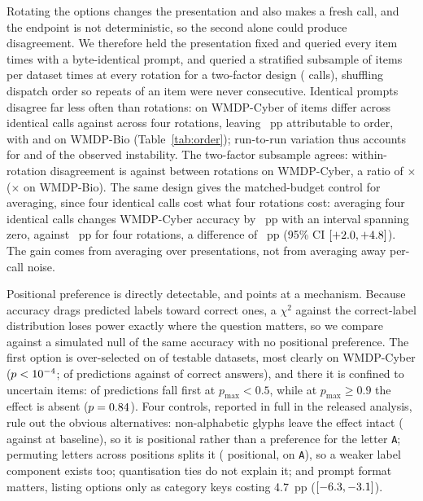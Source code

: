 \documentclass[conference,compsoc]{IEEEtran}
\newcommand{\pmax}{p_{\max}}
\begin{document}
Rotating the options changes the presentation and also makes a fresh call, and the endpoint
is not deterministic, so the second alone could produce disagreement. We therefore held the
presentation fixed and queried every item \statReRepeats{} times with a byte-identical
prompt, and queried a stratified subsample of \statReFacItems{} items per dataset
\statReFacRepeats{} times at every rotation for a two-factor design (\statReCalls{} calls),
shuffling dispatch order so repeats of an item were never consecutive. Identical prompts
disagree far less often than rotations: on WMDP-Cyber \statReIdentCyber{} of items differ
across \statReRepeats{} identical calls against \statReRotCyber{} across four rotations,
leaving \statReGapCyber{}~pp attributable to order, with \statReIdentBio{} and
\statReRotBio{} on WMDP-Bio (Table~\ref{tab:order}); run-to-run variation thus accounts for
\statReNoiseShareCyber{} and \statReNoiseShareBio{} of the observed instability. The
two-factor subsample agrees: within-rotation disagreement is \statReWithinCyber{} against
\statReBetweenCyber{} between rotations on WMDP-Cyber, a ratio of
\statReRatioCyber{}$\times$ (\statReRatioBio{}$\times$ on WMDP-Bio). The same design gives
the matched-budget control for averaging, since four identical calls cost
what four rotations cost: averaging four identical calls changes WMDP-Cyber accuracy by
\statReGainIdentCyber{}~pp with an interval spanning zero, against
\statReGainRotCyber{}~pp for four rotations, a difference of \statReGainDiffCyber{}~pp
(95\% CI $[+2.0, +4.8]{}$). The gain comes from averaging over presentations, not
from averaging away per-call noise.

Positional preference is directly detectable, and points at a mechanism. Because accuracy
drags predicted labels toward correct ones, a $\chi^2$ against the correct-label
distribution loses power exactly where the question matters, so we compare against a
simulated null of the same accuracy with no positional preference. The first option is
over-selected on \statNSigPosDatasets{} of \statNTestedPosDatasets{} testable datasets,
most clearly on WMDP-Cyber ($p <10^{-4}{}$; \statPosPredACyber{} of predictions
against \statPosGoldACyber{} of correct answers), and there it is confined to uncertain
items: \statPosLowPredA{} of predictions fall first at $\pmax < 0.5$, while at
$\pmax \geq 0.9$ the effect is absent ($p = 0.84{}$). Four controls, reported in
full in the released analysis, rule out the obvious alternatives: non-alphabetic glyphs
leave the effect intact (\statAbSymCyber{} against \statAbBaseCyber{} at baseline), so it
is positional rather than a preference for the letter \texttt{A}; permuting letters across
positions splits it (\statAbShufPosCyber{} positional, \statAbShufLetterCyber{} on
\texttt{A}), so a weaker label component exists too; quantisation ties do not explain it;
and prompt format matters, listing options only as category keys costing 4.7~pp
($[-6.3, -3.1]{}$).
\end{document}
